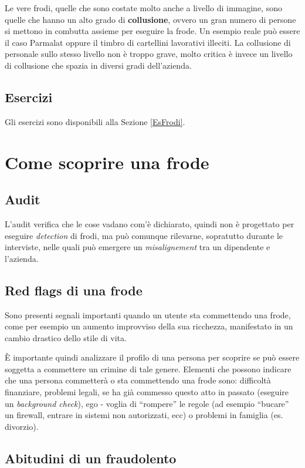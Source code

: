 Le vere frodi, quelle che sono costate molto anche a livello di immagine, sono
quelle che hanno un alto grado di \textbf{collusione}, ovvero un gran numero di
persone si mettono in combutta assieme per eseguire la frode. Un esempio 
reale può essere il caso Parmalat oppure il timbro di cartellini lavorativi 
illeciti. La collusione di personale sullo stesso livello non è troppo grave, 
molto critica è invece un livello di collusione che spazia in diversi gradi 
dell'azienda.

\subsection{Esercizi}

Gli esercizi sono disponibili alla Sezione \ref{EsFrodi}.

\section{Come scoprire una frode}

\subsection{Audit}

L'audit verifica che le cose vadano com'è dichiarato, quindi non è
progettato per eseguire \textit{detection} di frodi, ma può comunque 
rilevarne, sopratutto durante le interviste, nelle quali può emergere un 
\textit{misalignement} tra un dipendente e l'azienda.

\subsection{Red flags di una frode}
Sono presenti segnali importanti quando un utente sta commettendo una frode,
come per esempio un aumento improvviso della sua ricchezza, manifestato
in un cambio drastico dello stile di vita.

È importante quindi analizzare il profilo di una persona per scoprire se può
essere soggetta a commettere un crimine di tale genere. Elementi che possono 
indicare che una persona commetterà o sta commettendo una frode sono:
difficoltà finanziare, problemi legali, se ha già commesso questo atto in 
passato (eseguire un \textit{background check}), ego - voglia di ``rompere'' 
le regole (ad esempio ``bucare'' un firewall, entrare in sistemi non 
autorizzati, ecc) o problemi in famiglia (es. divorzio).

\subsection{Abitudini di un fraudolento}

